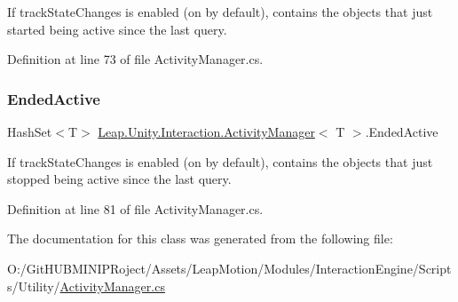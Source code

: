 If track\+State\+Changes is enabled (on by default), contains the objects that just started being active since the last query. 



Definition at line 73 of file Activity\+Manager.\+cs.

\mbox{\label{class_leap_1_1_unity_1_1_interaction_1_1_activity_manager_a8bb4ce485e63f6a02ddb97f8c420b72a}} 
\subsubsection{\texorpdfstring{EndedActive}{EndedActive}}
{\footnotesize\ttfamily Hash\+Set$<$T$>$ \mbox{\hyperlink{class_leap_1_1_unity_1_1_interaction_1_1_activity_manager}{Leap.\+Unity.\+Interaction.\+Activity\+Manager}}$<$ T $>$.Ended\+Active\hspace{0.3cm}{\ttfamily [get]}}



If track\+State\+Changes is enabled (on by default), contains the objects that just stopped being active since the last query. 



Definition at line 81 of file Activity\+Manager.\+cs.



The documentation for this class was generated from the following file\+:\begin{DoxyCompactItemize}
\item 
O\+:/\+Git\+H\+U\+B\+M\+I\+N\+I\+P\+Roject/\+Assets/\+Leap\+Motion/\+Modules/\+Interaction\+Engine/\+Scripts/\+Utility/\mbox{\hyperlink{_activity_manager_8cs}{Activity\+Manager.\+cs}}\end{DoxyCompactItemize}
